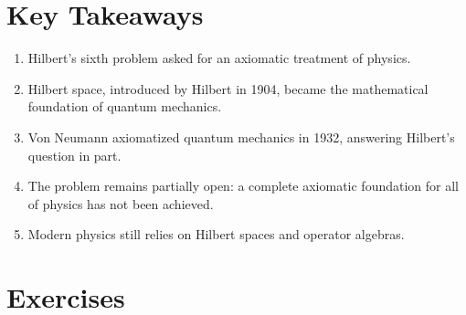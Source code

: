 \section*{Key Takeaways}

\begin{enumerate}
    \item Hilbert's sixth problem asked for an axiomatic treatment of physics.
    \item Hilbert space, introduced by Hilbert in 1904, became the mathematical foundation of quantum mechanics.
    \item Von Neumann axiomatized quantum mechanics in 1932, answering Hilbert's question in part.
    \item The problem remains partially open: a complete axiomatic foundation for all of physics has not been achieved.
    \item Modern physics still relies on Hilbert spaces and operator algebras.
\end{enumerate}

\section*{Exercises}


